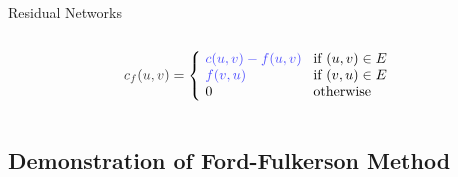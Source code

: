 \documentclass[aspectratio=169,c]{beamer} %
\begin{document}
\begin{frame}{Residual Networks}
\begin{columns}[c]
\begin{column}
\begin{definition}
                \begin{equation*}
                    {\color{black!80}c_f(u,v)}=\left\{\begin{array}{ll} \!{\color{blue!70}c(u,v)-f(u,v)} & \!\text{if }(u,v)\in E \\ \!{\color{blue!70}f(v,u)} & \!\text{if }(v,u)\in E \\ \!0 & \!\text{otherwise} \end{array}\right.
                \end{equation*}
            \end{definition}
        \end{column}
    \end{columns}
\end{frame}

\subsection*{Demonstration of Ford-Fulkerson Method}
\end{document}
